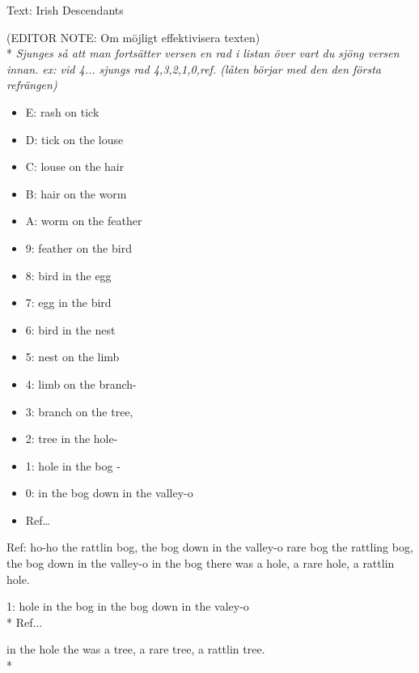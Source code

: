 \begin{SongText}
\begin{SongInfo}
    Text: Irish Descendants
\end{SongInfo}
\begin{SongVerse}
(EDITOR NOTE: Om möjligt effektivisera texten)\\*%
\emph{Sjunges så att man fortsätter versen en rad i listan över vart 
du sjöng versen innan. ex: vid 4... sjungs rad 4,3,2,1,0,ref. 
(låten börjar med den den första refrängen)}
\begin{itemize}
    \item E: rash on tick
    \item D: tick on the louse
    \item C: louse on the hair
    \item B: hair on the worm
    \item A: worm on the feather
    \item 9: feather on the bird
    \item 8: bird in the egg
    \item 7: egg in the bird
    \item 6: bird in the nest
    \item 5: nest on the limb
    \item 4: limb on the branch-
    \item 3: branch on the tree,
    \item 2: tree in the hole-
    \item 1: hole in the bog -
    \item 0: in the bog down in the valley-o
    \item Ref…
\end{itemize}
Ref:
ho-ho the rattlin bog, the bog down in the valley-o
rare bog the rattling bog, the bog down in the valley-o
in the bog there was a hole, a rare hole, a rattlin hole.
\end{SongVerse}
\begin{SongVerse}
1:
hole in the bog in the bog down in the valey-o\\*%
Ref... 
\end{SongVerse}
\begin{SongVerse}
in the hole the was a tree, a rare tree, a rattlin tree.\\*%

\end{SongVerse}
\end{SongText}
